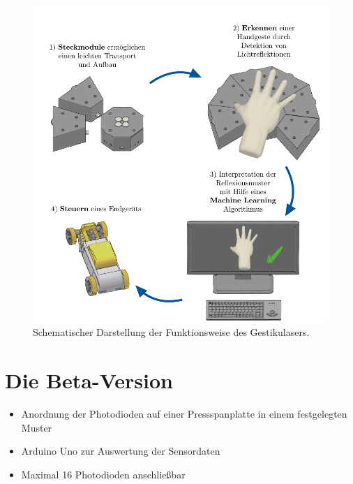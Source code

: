 \documentclass{sciposter}
\begin{document}
\begin{multicols}{3}
\begin{figure}[h]
	\centering
	\includegraphics[scale=1.3]{../figures/tikz/GestikulaserAblauf.pdf}
	\caption{Schematischer Darstellung der Funktionsweise des Gestikulasers.}
	\label{fig:FunktionsweiseGestikulaser}
\end{figure}


\section{Die Beta-Version}

\begin{itemize}
	\item Anordnung der Photodioden auf einer Pressspanplatte in einem festgelegten Muster
	\item Arduino Uno zur Auswertung der Sensordaten
	\item Maximal 16 Photodioden anschließbar
\end{itemize}


\end{multicols}
\end{document}
